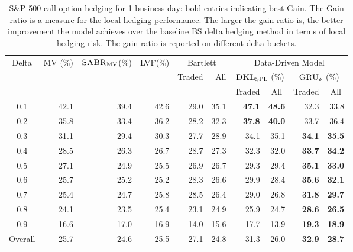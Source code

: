 \documentclass[letterpaper,12pt,titlepage,oneside,final]{book}
\numberwithin{equation}{section}
\theoremstyle{definition}
\newcommand{\model}{\textsc{GRU}_\delta}
\newcommand{\DKLs}{\bf\textsc{DKL}_{\text{SPL}}}
\newcommand{\LVF}{\textsc{LVF}}
\newcommand{\SABR}{\bf\textsc{SABR}_{\text{MV}}}
\begin{document}
\begin{table}[htp!]
\centering
\begin{threeparttable}
\begin{tabular}{|c |r r r r r r r r r|}
\hline
\multirow{3}{*}{Delta}&\multirow{3}{*}{MV (\%)}&\multirow{3}{*}{\;$\SABR$(\%)}&\multirow{3}{*}{\LVF (\%)}&\multicolumn{2}{c|}{Bartlett}& \multicolumn{4}{c|}{Data-Driven Model}\\
&&&&\multirow{2}{*}{Traded}&\multirow{2}{*}{All}&\multicolumn{2}{|c}{$\DKLs$ (\%)} &\multicolumn{2}{c|}{$\model$ (\%)}\\
&&&&&&\multicolumn{1}{|c}{\small Traded}&\multicolumn{1}{c}{\small All}&\multicolumn{1}{c}{\small Traded}&\multicolumn{1}{c|}{\small All}\\ \hline
  0.1 & 42.1 & 39.4 & 42.6 &29.0 &35.1    & \textbf{47.1}  & \textbf{48.6}        &32.3          &   33.8        \\
  0.2 & 35.8 & 33.4 & 36.2 &28.2 &32.3    & \textbf{37.8}  & \textbf{40.0}       &33.7          &   36.4        \\
  0.3 & 31.1 & 29.4 & 30.3 &27.7 &28.9   & 34.1  & 35.1        &\textbf{34.1}          &\textbf{35.5}        \\
  0.4 & 28.5 & 26.3 & 26.7 &28.7 &27.3   & 32.3  & 32.0        &\textbf{33.7} &\textbf{34.2}    \\
  0.5 & 27.1 & 24.9 & 25.5 &26.9 &26.7   & 29.3  & 29.4        &\textbf{35.1} &\textbf{33.0}   \\
  0.6 & 25.7 & 25.2 & 25.2 &28.3 &26.6   & 29.9  & 28.4        &\textbf{35.6} &\textbf{32.1}    \\
  0.7 & 25.4 & 24.7 & 25.8 &28.5 &26.4   & 29.0  & 26.8        &\textbf{31.8} &\textbf{29.7}   \\
  0.8 & 24.1 & 23.5 & 25.4 &23.1 &24.9   & 25.9  & 24.7        &\textbf{28.6} &\textbf{26.5}   \\
  0.9 & 16.6 & 17.0 & 16.9 &14.0 &15.6   & 17.7  & 13.9        &\textbf{19.3} &\textbf{18.9}    \\
  Overall & 25.7 & 24.6 & 25.5 &27.1 &24.8 & 31.3  & 26.0        &\textbf{32.9} & \textbf{28.7} \\
  \hline
\end{tabular}
\caption{S\&P 500 call option hedging for 1-business day: bold entries indicating best Gain.  The Gain ratio is a measure for the local hedging performance. The larger the gain ratio is, the better improvement the model achieves over the baseline BS delta hedging method in terms of local hedging risk. The gain ratio is reported on different delta buckets.}
\label{SP500Call}

\end{threeparttable}
\end{table}
\end{document}
